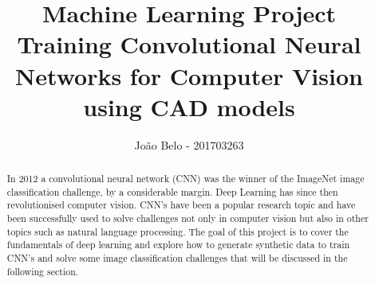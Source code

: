 \documentclass[10pt,a4paper]{article}
\title{\textbf{Machine Learning Project} \\ Training Convolutional Neural Networks for Computer Vision using CAD models}
\author{João Belo - 201703263}
\begin{document}
\maketitle
\begin{abstract}
In 2012 a convolutional neural network (CNN)\cite{} was the winner of the ImageNet image classification challenge, by a considerable margin. Deep Learning has since then revolutionised computer vision. CNN's have been a popular research topic and have been successfully used to solve challenges not only in computer vision but also in other topics such as natural language processing. The goal of this project is to cover the fundamentals of deep learning and explore how to generate synthetic data to train CNN's and solve some image classification challenges that will be discussed in the following section.
\end{abstract}

\section{}



\end{document}
